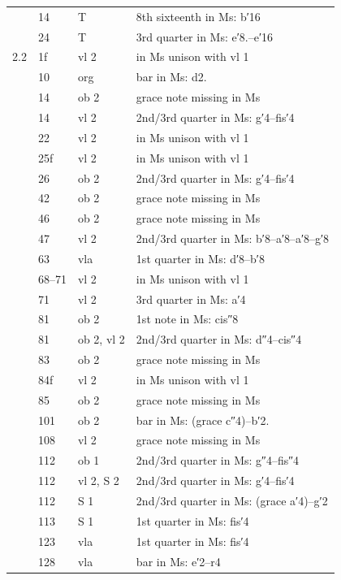 \documentclass[parskip=full]{scrreprt}
\begin{document}
\begin{longtable}{lll L{10cm}}
       & 14  & T       & 8th sixteenth in Ms: b′16 \\
       & 24  & T       & 3rd quarter in Ms: e′8.–e′16 \\
  2.2  & 1f  & vl 2    & in Ms unison with vl 1 \\
       & 10  & org     & bar in Ms: d2. \\
       & 14  & ob 2    & grace note missing in Ms \\
       & 14  & vl 2    & 2nd/3rd quarter in Ms: g′4–fis′4 \\
       & 22  & vl 2    & in Ms unison with vl 1 \\
       & 25f & vl 2    & in Ms unison with vl 1 \\
       & 26  & ob 2    & 2nd/3rd quarter in Ms: g′4–fis′4 \\
       & 42  & ob 2    & grace note missing in Ms \\
       & 46  & ob 2    & grace note missing in Ms \\
       & 47  & vl 2    & 2nd/3rd quarter in Ms: b′8–a′8–a′8–g′8 \\
       & 63  & vla     & 1st quarter in Ms: d′8–b′8 \\
       & 68–71 & vl 2  & in Ms unison with vl 1 \\
       & 71  & vl 2    & 3rd quarter in Ms: a′4 \\
       & 81  & ob 2    & 1st note in Ms: cis″8 \\
       & 81  & ob 2, vl 2 & 2nd/3rd quarter in Ms: d″4–cis″4 \\
       & 83  & ob 2    & grace note missing in Ms \\
       & 84f & vl 2    & in Ms unison with vl 1 \\
       & 85  & ob 2    & grace note missing in Ms \\
       & 101 & ob 2    & bar in Ms: (grace c″4)–b′2. \\
       & 108 & vl 2    & grace note missing in Ms \\
       & 112 & ob 1    & 2nd/3rd quarter in Ms: g″4–fis″4 \\
       & 112 & vl 2, S 2 & 2nd/3rd quarter in Ms: g′4–fis′4 \\
       & 112 & S 1     & 2nd/3rd quarter in Ms: (grace a′4)–g′2 \\
       & 113 & S 1     & 1st quarter in Ms: fis′4 \\
       & 123 & vla     & 1st quarter in Ms: fis′4 \\
       & 128 & vla     & bar in Ms: e′2–r4 \\

\end{longtable}
\end{document}
